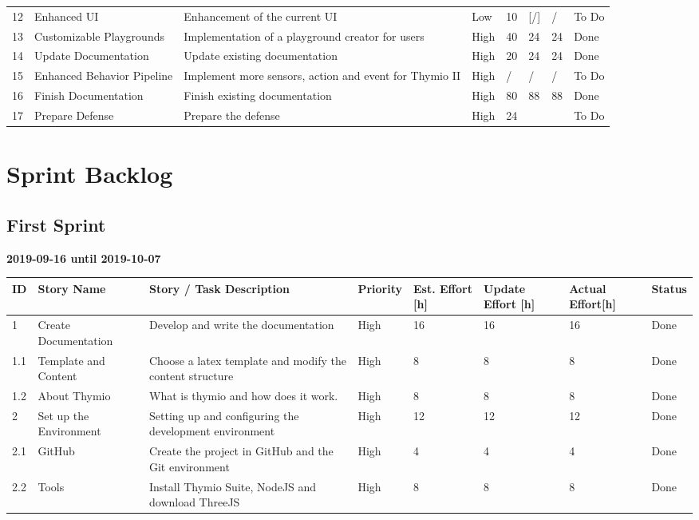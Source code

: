 \documentclass{scrreprt}
\begin{document}
\begin{longtable}{p{5mm}|p{2cm}|p{4cm}|p{1cm}|p{1cm}|p{1cm}|p{1cm}|p{15mm}}
  12 & Enhanced UI & Enhancement of the current UI & Low & 10 & [/] & {/} & To Do \\ 
  13 & Customizable Playgrounds & Implementation of a playground creator for users & High & 40 & 24 & 24 & Done \\ 
  14 & Update Documentation & Update existing documentation & High & 20 & 24 & 24 & Done \\ 
  15 & Enhanced Behavior Pipeline & Implement more sensors, action and event for Thymio II & High & {/} & {/} & {/} & To Do \\ 
  16 & Finish Documentation & Finish existing documentation & High & 80 & 88 & 88 & Done \\
  17 & Prepare Defense & Prepare the defense & High & 24 &  &  & To Do \\ 
\end{longtable}

\chapter{Sprint Backlog}
\section{First Sprint}
\textbf{2019-09-16 until 2019-10-07}
\begin{longtable}{p{5mm}|p{2cm}|p{4cm}|p{1cm}|p{1cm}|p{1cm}|p{1cm}|p{15mm}}
  ID                     & Story Name & Story / Task Description & Priority & Est. Effort {[}h{]} & Update Effort {[}h{]} & Actual Effort{[}h{]} & Status                \\ \hline
  1 & Create Documentation & Develop and write the documentation & High & 16 & 16 & 16 & Done \\ 
  1.1 & Template and Content & Choose a latex template and modify the content structure & High & 8 & 8 & 8 & Done \\ 
  1.2 & About Thymio & What is thymio and how does it work. & High & 8 & 8 & 8 & Done \\ 
  2 & Set up the Environment & Setting up and configuring the development environment & High & 12 & 12 & 12 & Done \\ 
  2.1 & GitHub & Create the project in GitHub and the Git environment & High & 4 & 4 & 4 & Done \\ 
  2.2 & Tools & Install Thymio Suite, NodeJS and download ThreeJS & High & 8 & 8 & 8 & Done \\ 
\end{longtable}
\end{document}
